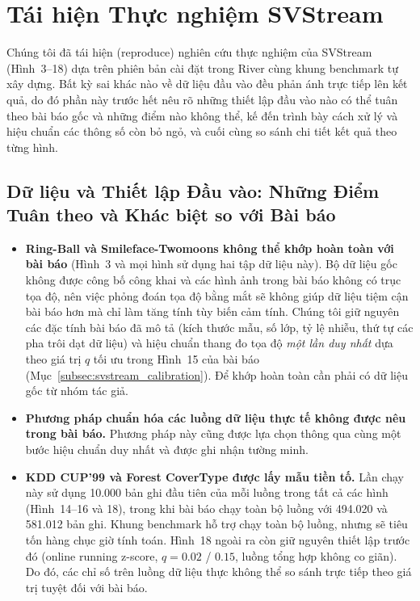 \section{Tái hiện Thực nghiệm SVStream}
\label{sec:svstream_reproduction}

Chúng tôi đã tái hiện (reproduce) nghiên cứu thực nghiệm của SVStream~\cite{wang2013svstream} (Hình~3--18) dựa trên phiên bản cài đặt trong River cùng khung benchmark tự xây dựng. Bất kỳ sai khác nào về dữ liệu đầu vào đều phản ánh trực tiếp lên kết quả, do đó phần này trước hết nêu rõ những thiết lập đầu vào nào có thể tuân theo bài báo gốc và những điểm nào không thể, kế đến trình bày cách xử lý và hiệu chuẩn các thông số còn bỏ ngỏ, và cuối cùng so sánh chi tiết kết quả theo từng hình.

\subsection{Dữ liệu và Thiết lập Đầu vào: Những Điểm Tuân theo và Khác biệt so với Bài báo}
\label{subsec:svstream_inputs}

\begin{itemize}[leftmargin=1.4em,itemsep=2pt]
  \item \textbf{Ring-Ball và Smileface-Twomoons không thể khớp hoàn toàn với bài báo} (Hình~3 và mọi hình sử dụng hai tập dữ liệu này). Bộ dữ liệu gốc không được công bố công khai và các hình ảnh trong bài báo không có trục tọa độ, nên việc phỏng đoán tọa độ bằng mắt sẽ không giúp dữ liệu tiệm cận bài báo hơn mà chỉ làm tăng tính tùy biến cảm tính. Chúng tôi giữ nguyên các đặc tính bài báo đã mô tả (kích thước mẫu, số lớp, tỷ lệ nhiễu, thứ tự các pha trôi dạt dữ liệu) và hiệu chuẩn thang đo tọa độ \emph{một lần duy nhất} dựa theo giá trị $q$ tối ưu trong Hình~15 của bài báo (Mục~\ref{subsec:svstream_calibration}). Để khớp hoàn toàn cần phải có dữ liệu gốc từ nhóm tác giả.
  \item \textbf{Phương pháp chuẩn hóa các luồng dữ liệu thực tế không được nêu trong bài báo.} Phương pháp này cũng được lựa chọn thông qua cùng một bước hiệu chuẩn duy nhất và được ghi nhận tường minh.
  \item \textbf{KDD CUP'99 và Forest CoverType được lấy mẫu tiền tố.} Lần chạy này sử dụng 10.000 bản ghi đầu tiên của mỗi luồng trong tất cả các hình (Hình~14--16 và 18), trong khi bài báo chạy toàn bộ luồng với 494.020 và 581.012 bản ghi. Khung benchmark hỗ trợ chạy toàn bộ luồng, nhưng sẽ tiêu tốn hàng chục giờ tính toán. Hình~18 ngoài ra còn giữ nguyên thiết lập trước đó (online running z-score, $q=0.02$ / $0.15$, luồng tổng hợp không co giãn). Do đó, các chỉ số trên luồng dữ liệu thực không thể so sánh trực tiếp theo giá trị tuyệt đối với bài báo.
\end{itemize}

